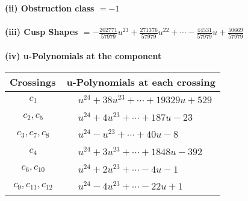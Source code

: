 \documentclass[1p]{elsarticle_modified}
\theoremstyle{definition}
\begin{document}
\flushleft \textbf{(ii) Obstruction class $= -1$}\\~\\
\flushleft \textbf{(iii) Cusp Shapes $= -\frac{202771}{57979} u^{23}+\frac{271376}{57979} u^{22}+\cdots-\frac{44531}{57979} u+\frac{50669}{57979}$}\\~\\
\newpage\renewcommand{\arraystretch}{1}
\flushleft \textbf{(iv) u-Polynomials at the component}\newline \\
\begin{tabular}{m{50pt}|m{274pt}}
Crossings & \hspace{64pt}u-Polynomials at each crossing \\
\hline $$\begin{aligned}c_{1}\end{aligned}$$&$\begin{aligned}
&u^{24}+38 u^{23}+\cdots+19329 u+529
\end{aligned}$\\
\hline $$\begin{aligned}c_{2},c_{5}\end{aligned}$$&$\begin{aligned}
&u^{24}+4 u^{23}+\cdots+187 u-23
\end{aligned}$\\
\hline $$\begin{aligned}c_{3},c_{7},c_{8}\end{aligned}$$&$\begin{aligned}
&u^{24}- u^{23}+\cdots+40 u-8
\end{aligned}$\\
\hline $$\begin{aligned}c_{4}\end{aligned}$$&$\begin{aligned}
&u^{24}+3 u^{23}+\cdots+1848 u-392
\end{aligned}$\\
\hline $$\begin{aligned}c_{6},c_{10}\end{aligned}$$&$\begin{aligned}
&u^{24}+2 u^{23}+\cdots-4 u-1
\end{aligned}$\\
\hline $$\begin{aligned}c_{9},c_{11},c_{12}\end{aligned}$$&$\begin{aligned}
&u^{24}-4 u^{23}+\cdots-22 u+1
\end{aligned}$\\
\hline
\end{tabular}\\~\\
\end{document}
